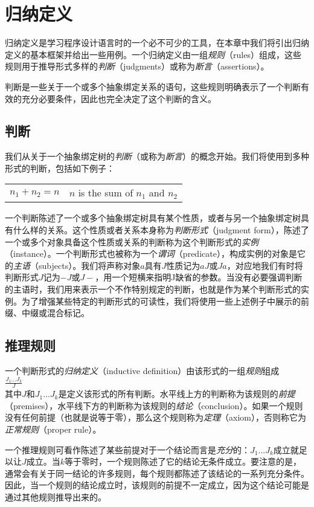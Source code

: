 \newtheorem{rules}{{规则}}
\chapter{归纳定义}
归纳定义是学习程序设计语言时的一个必不可少的工具，在本章中我们将引出归纳定义的基本框架并给出一些用例。一个归纳定义由一组\textit{规则}（rules）组成，这些规则用于推导形式多样的\textit{判断}（judgments）或称为\textit{断言}（assertions）。
 
判断是一些关于一个或多个抽象绑定关系的语句，这些规则明确表示了一个判断有效的充分必要条件，因此也完全决定了这个判断的含义。
\section{判断}
我们从关于一个抽象绑定树的\textit{判断}（或称为\textit{断言}）的概念开始。我们将使用到多种形式的判断，包括如下例子：
\begin{center}
	\begin{tabular}{ll}
	$n_{1} + n_{2} = n$ & $n$ is the sum of $n_{1}$ and $n_{2}$ 
	\end{tabular}
\end{center}
一个判断陈述了一个或多个抽象绑定树具有某个性质，或者与另一个抽象绑定树具有什么样的关系。这个性质或者关系本身称为\textit{判断形式}（judgment form），陈述了一个或多个对象具备这个性质或关系的判断称为这个判断形式的\textit{实例}（instance）。一个判断形式也被称为一个\textit{谓词}（predicate），构成实例的对象是它的\textit{主语}（subjects）。我们将声称对象$a$具有$J$性质记为$aJ$或$Ja$，对应地我们有时将判断形式$J$记为$-J$或$J-$，用一个短横来指明J缺省的参数。当没有必要强调判断的主语时，我们用来表示一个不作特别规定的判断，也就是作为某个判断形式的实例。为了增强某些特定的判断形式的可读性，我们将使用一些上述例子中展示的前缀、中缀或混合标记。
\section{推理规则}
一个判断形式的\textit{归纳定义}（inductive definition）由该形式的一组\textit{规则}组成 \\
$\frac{J_{1} ... J_{k}}{J} $ \\
其中$J$和$J_{1} ... J_{k}$是定义该形式的所有判断。水平线上方的判断称为该规则的\textit{前提}（premises），水平线下方的判断称为该规则的\textit{结论}（conclusion）。如果一个规则没有任何前提（也就是说等于零），那么这个规则称为\textit{定理}（axiom），否则称它为\textit{正常规则}（proper rule）。

一个推理规则可看作陈述了某些前提对于一个结论而言是\textit{充分}的：$J_{1} ... J_{k}$成立就足以让$J$成立。当$k$等于零时，一个规则陈述了它的结论无条件成立。要注意的是，通常会有关于同一结论的许多规则，每个规则都陈述了该结论的一系列充分条件。因此，当一个规则的结论成立时，该规则的前提不一定成立，因为这个结论可能是通过其他规则推导出来的。

